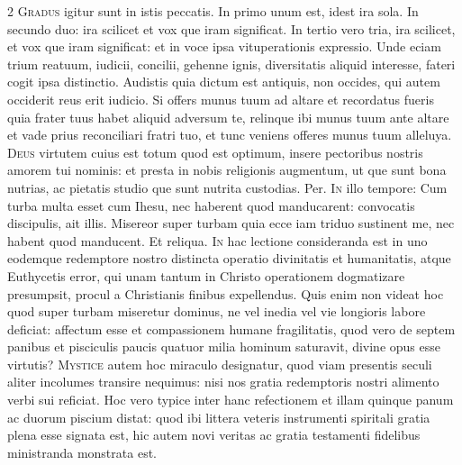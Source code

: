 \begin{multicols*}{2}
\lettrine[lines=2]{\zallmancaps \color{Blue} G}{radus} igitur sunt in istis peccatis. In primo unum est, idest ira sola. In secundo duo: ira scilicet et vox que iram significat. In tertio vero tria, ira scilicet, et vox que iram significat: et in voce ipsa vituperationis expressio. Unde eciam trium reatuum, iudicii, concilii, gehenne ignis, diversitatis aliquid interesse, fateri cogit ipsa distinctio.
 Audistis quia dictum est antiquis, non occides, qui autem occiderit reus erit iudicio.
 Si offers munus tuum ad altare et recordatus fueris quia frater tuus habet aliquid adversum te, relinque ibi munus tuum ante altare et vade prius reconciliari fratri tuo, et tunc veniens offeres munus tuum alleluya.
\lettrine[lines=2]{\zallmancaps \color{Red} D}{eus} virtutem cuius est totum quod est optimum, insere pectoribus nostris amorem tui nominis: et presta in nobis religionis augmentum, ut que sunt bona nutrias, ac pietatis studio que sunt nutrita custodias. Per.
\lettrine[lines=2]{\zallmancaps \color{Blue} I}{n} illo tempore: Cum turba multa esset cum Ihesu, nec haberent quod manducarent: convocatis discipulis, ait illis. Misereor super turbam quia ecce iam triduo sustinent me, nec habent quod manducent. Et reliqua.
 \grecross
\lettrine[lines=2]{\zallmancaps \color{Red} I}{n} hac lectione consideranda est in uno eodemque redemptore nostro distincta operatio divinitatis et humanitatis, atque Euthycetis error, qui unam tantum in Christo operationem dogmatizare presumpsit, procul a Christianis finibus expellendus. Quis enim non videat hoc quod super turbam miseretur dominus, ne vel inedia vel vie longioris labore deficiat: affectum esse et compassionem humane fragilitatis, quod vero de septem panibus et pisciculis paucis quatuor milia hominum saturavit, divine opus esse virtutis?
\lettrine[lines=2]{\zallmancaps \color{Blue} M}{ystice} autem hoc miraculo designatur, quod viam presentis seculi aliter incolumes transire nequimus: nisi nos gratia redemptoris nostri alimento verbi sui reficiat. Hoc vero typice inter hanc refectionem et illam quinque panum ac duorum piscium distat: quod ibi littera veteris instrumenti spiritali gratia plena esse signata est, hic autem novi veritas ac gratia testamenti fidelibus ministranda monstrata est.

\end{multicols*}
